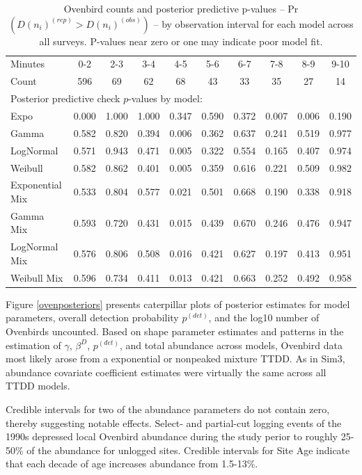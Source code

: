 \documentclass[useAMS,usenatbib,referee,12pt]{article}
\newcommand{\pdet}{p^{(det)}}
\begin{document}
\begin{table}[ht]
\centering
\begin{tabular}{lccccccccc}
  \hline
Minutes & 0-2 & 2-3 & 3-4 & 4-5 & 5-6 & 6-7 & 7-8 & 8-9 & 9-10 \\ 
Count & 596 & 69 & 62 & 68 & 43 & 33 & 35 & 27 & 14 \\ 
\hline
\multicolumn{10}{l}{Posterior predictive check $p$-values by model:}\\
\hline
Expo & 0.000 & 1.000 & 1.000 & 0.347 & 0.590 & 0.372 & 0.007 & 0.006 & 0.190 \\ 
  Gamma & 0.582 & 0.820 & 0.394 & 0.006 & 0.362 & 0.637 & 0.241 & 0.519 & 0.977 \\ 
  LogNormal & 0.571 & 0.943 & 0.471 & 0.005 & 0.322 & 0.554 & 0.165 & 0.407 & 0.974 \\ 
  Weibull & 0.582 & 0.862 & 0.401 & 0.005 & 0.359 & 0.616 & 0.221 & 0.509 & 0.982 \\ 
\hline
  Exponential Mix & 0.533 & 0.804 & 0.577 & 0.021 & 0.501 & 0.668 & 0.190 & 0.338 & 0.918 \\ 
  Gamma Mix & 0.593 & 0.720 & 0.431 & 0.015 & 0.439 & 0.670 & 0.246 & 0.476 & 0.947 \\ 
  LogNormal Mix & 0.576 & 0.806 & 0.508 & 0.016 & 0.421 & 0.627 & 0.197 & 0.413 & 0.951 \\ 
  Weibull Mix & 0.596 & 0.734 & 0.411 & 0.013 & 0.421 & 0.663 & 0.252 & 0.492 & 0.958 \\ 
   \hline
\end{tabular}
\caption{\label{tbl:ovencounts} Ovenbird counts and posterior predictive p-values -- Pr$\left(D(n_i)^{(rep)} > D(n_i)^{(obs)}\right)$ -- by observation interval for each model across all surveys.  P-values near zero or one may indicate poor model fit.}
\end{table}

Figure \ref{ovenposteriors} presents caterpillar plots of posterior estimates for model parameters, overall detection probability $\pdet$, and the log10 number of Ovenbirds uncounted.  
Based on shape parameter estimates and patterns in the estimation of $\gamma$, $\beta^D$, $\pdet$, and total abundance across models, Ovenbird data most likely arose from a exponential or nonpeaked mixture TTDD.
As in Sim3, abundance covariate coefficient estimates were virtually the same across all TTDD models.  

Credible intervals for two of the abundance parameters do not contain zero, thereby suggesting notable effects.  
Select- and partial-cut logging events of the 1990s depressed local Ovenbird abundance during the study perior to roughly 25-50\% of the abundance for unlogged sites.  
Credible intervals for Site Age indicate that each decade of age increases abundance from 1.5-13\%.
\end{document}
